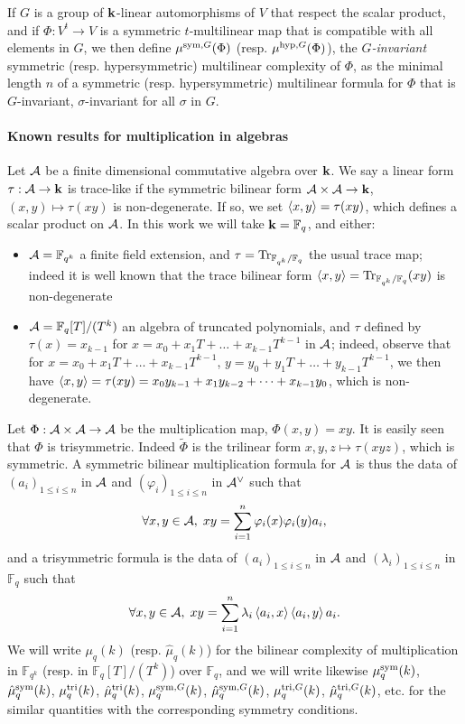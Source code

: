 \documentclass[11pt]{article}
\begin{document}
If $G$ is a group of $\mathbf{k}$-linear automorphisms of $V$
that respect the scalar product, and if $\Phi:V^t\to V$ is a symmetric $t$-multilinear map that is compatible with all elements in $G$,
we then define $\mu^{\textrm{sym},G}(\Phi)$ (resp. $\mu^{\textrm{hyp},G}(\Phi)$),
the \emph{$G$-invariant} symmetric (resp. hypersymmetric) multilinear complexity of $\Phi$,
as the minimal length $n$ of a symmetric (resp. hypersymmetric) multilinear formula for $\Phi$ that is $G$-invariant, \ie $\sigma$-invariant for all $\sigma$ in $G$. 


\paragraph{Known results for multiplication in algebras}

Let $\mathcal{A}$ be a finite dimensional commutative algebra over $\mathbf{k}$.
We say a linear form $\tau:\mathcal{A}\to\mathbf{k}$ is trace-like if the symmetric bilinear form $\mathcal{A}\times\mathcal{A}\to\mathbf{k}$, $(x,y)\mapsto\tau(xy)$ is non-degenerate.
If so, we set $\left\langle x,y\right\rangle=\tau(xy)$, which defines a scalar product on $\mathcal{A}$.
In this work we will take $\mathbf{k}=\mathbb{F}_q$, and either:
\begin{itemize}
\item $\mathcal{A}=\mathbb{F}_{q^k}$ a finite field extension, and $\tau=\operatorname{Tr}_{\mathbb{F}_{q^k}/\mathbb{F}_q}$ the usual trace map; indeed it is well known that the trace bilinear form $\left\langle x,y\right\rangle=\operatorname{Tr}_{\mathbb{F}_{q^k}/\mathbb{F}_q}(xy)$ is non-degenerate
\item $\mathcal{A}=\mathbb{F}_q[T]/(T^k)$ an algebra of truncated polynomials,
and $\tau$ defined by $\tau(x)=x_{k-1}$ for $x=x_0+x_1T+\dots+x_{k-1}T^{k-1}$ in $\mathcal{A}$;
indeed, observe that for $x=x_0+x_1T+\dots+x_{k-1}T^{k-1}$, $y=y_0+y_1T+\dots+y_{k-1}T^{k-1}$,
we then have $\left\langle x,y\right\rangle=\tau(xy)=x_0y_{k-1}+x_1y_{k-2}+\dots+x_{k-1}y_0$, which is non-degenerate.
\end{itemize}
Let $\Phi:\mathcal{A}\times\mathcal{A}\to\mathcal{A}$ be the multiplication map, $\Phi(x,y)=xy$.
It is easily seen that $\Phi$ is trisymmetric.
Indeed $\widetilde{\Phi}$ is the trilinear form $x,y,z\mapsto \tau(xyz)$,
which is symmetric.
A symmetric bilinear multiplication formula for $\mathcal{A}$ is thus the data
of $(a_i)_{1\leq i\leq n}$ in $\mathcal{A}$ and $(\varphi_i)_{1\leq i\leq n}$ in $\mathcal{A}^\vee$ such that
\begin{equation}
\forall x, y\in\mathcal{A},\;xy = \sum_{i=1}^{n}\varphi_i(x)\varphi_i(y)a_i,
\label{eq:sym-tr}
\end{equation}
and a trisymmetric formula is the data of $(a_i)_{1\leq i\leq n}$ in $\mathcal{A}$
and $(\lambda_i)_{1\leq i\leq n}$ in $\mathbb{F}_q$ such that
\begin{equation}
\forall x, y\in\mathcal{A},\;xy = \sum_{i=1}^{n}\lambda_i\left\langle a_i,x\right\rangle\left\langle a_i,y\right\rangle a_i.
\label{eq:tri-sym}
\end{equation}
We will write $\mu_q(k)$ (resp. $\hat\mu_q(k)$) for the bilinear complexity of multiplication in $\mathbb{F}_{q^k}$ (resp. in $\mathbb{F}_q[T]/(T^k)$) over $\mathbb{F}_q$,
and we will write likewise $\mu^{\textrm{sym}}_q(k)$, $\hat\mu^{\textrm{sym}}_q(k)$, $\mu^{\textrm{tri}}_q(k)$, $\hat\mu^{\textrm{tri}}_q(k)$, $\mu^{\textrm{sym},G}_q(k)$, $\hat\mu^{\textrm{sym},G}_q(k)$, $\mu^{\textrm{tri},G}_q(k)$, $\hat\mu^{\textrm{tri},G}_q(k)$, etc.
for the similar quantities with the corresponding symmetry conditions.
\end{document}
